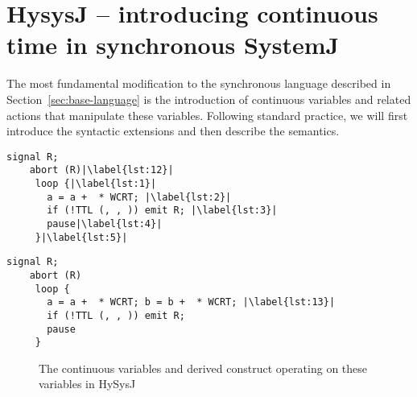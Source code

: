 \documentclass[10pt,journal,cspaper,compsoc]{IEEEtran}
\begin{document}
\section{HysysJ -- introducing continuous time in synchronous SystemJ}
\label{sec:example-driv-inform}

The most fundamental modification to the synchronous language described
in Section~\ref{sec:base-language} is the introduction of continuous
variables and related actions that manipulate these variables. Following
standard practice, we will first introduce the syntactic extensions and
then describe the semantics.

\newbox{\rgone}
\begin{lrbox}{\rgone}
  \begin{lstlisting}[mathescape,style=sysj,morekeywords={signal,loop,abort,await,emit,present,trap,pause,exit,delay,suspend},escapechar=|]
    signal R;
    abort (R)|\label{lst:12}| 
     loop {|\label{lst:1}|
       a = a +  * WCRT; |\label{lst:2}|
       if (!TTL (, , )) emit R; |\label{lst:3}|
       pause|\label{lst:4}|
     }|\label{lst:5}|
  \end{lstlisting}
\end{lrbox}

\newbox{\rgtwo}
\begin{lrbox}{\rgtwo}
  \begin{lstlisting}[mathescape,style=sysj,morekeywords={signal,loop,abort,await,emit,present,trap,pause,exit,delay,suspend},escapechar=|]
    signal R;
    abort (R) 
     loop {
       a = a +  * WCRT; b = b +  * WCRT; |\label{lst:13}|
       if (!TTL (, , )) emit R; 
       pause
     }
  \end{lstlisting}
\end{lrbox}




\begin{figure}[t!]
  \centering
  
  \hspace{30pt}
  \caption{The continuous variables and derived construct operating on
    these variables in HySysJ}
  \label{fig:7}
\end{figure}
\end{document}
